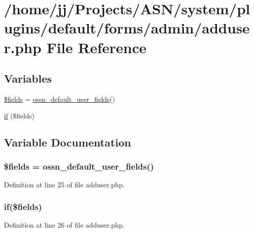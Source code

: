 \hypertarget{forms_2admin_2adduser_8php}{}\section{/home/jj/\+Projects/\+A\+S\+N/system/plugins/default/forms/admin/adduser.php File Reference}
\label{forms_2admin_2adduser_8php}
\subsection*{Variables}
\begin{DoxyCompactItemize}
\item 
\hyperlink{forms_2admin_2adduser_8php_ab2303c817e3b402b77b7f99627b9c319}{\$fields} = \hyperlink{ossn_8lib_8users_8php_a17b6a923a5faa7e3c5f6223854557a72}{ossn\+\_\+default\+\_\+user\+\_\+fields}()
\item 
\hyperlink{forms_2admin_2adduser_8php_a2b3754430c8a4072d53bc0fdeff03509}{if} (\$fields)
\end{DoxyCompactItemize}


\subsection{Variable Documentation}
\subsubsection[{\texorpdfstring{\$fields}{$fields}}]{\setlength{\rightskip}{0pt plus 5cm}\$fields = {\bf ossn\+\_\+default\+\_\+user\+\_\+fields}()}\hypertarget{forms_2admin_2adduser_8php_ab2303c817e3b402b77b7f99627b9c319}{}\label{forms_2admin_2adduser_8php_ab2303c817e3b402b77b7f99627b9c319}


Definition at line 25 of file adduser.\+php.

\subsubsection[{\texorpdfstring{if}{if}}]{\setlength{\rightskip}{0pt plus 5cm}if(\$fields)}\hypertarget{forms_2admin_2adduser_8php_a2b3754430c8a4072d53bc0fdeff03509}{}\label{forms_2admin_2adduser_8php_a2b3754430c8a4072d53bc0fdeff03509}


Definition at line 26 of file adduser.\+php.

